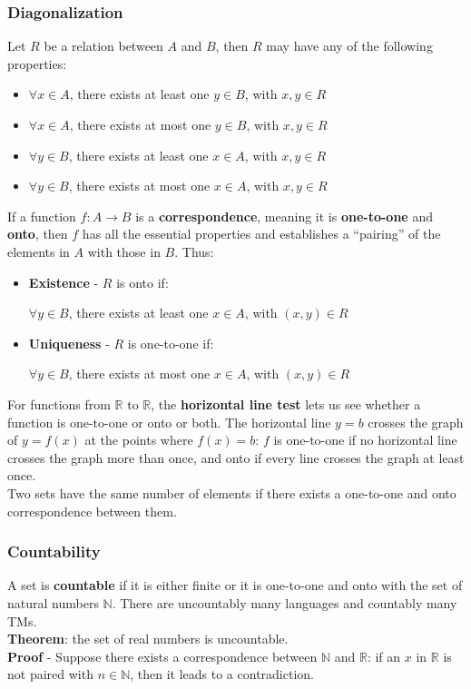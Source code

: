 \documentclass{article}
\begin{document}
\subsubsection{Diagonalization}
Let $R$ be a relation between $A$ and $B$, then $R$ may have any of the following properties:
\begin{itemize}
    \item $\forall x \in A$, there exists at least one $y \in B$, with $x, y \in R$ 
    \item $\forall x \in A$, there exists at most one $y \in B$, with $x, y \in R$ 
    \item $\forall y \in B$, there exists at least one $x \in A$, with $x, y \in R$ 
    \item $\forall y \in B$, there exists at most one $x \in A$, with $x, y \in R$ 
\end{itemize}
If a function $f: A\rightarrow B$ is a \textbf{correspondence}, meaning it is \textbf{one-to-one} and \textbf{onto}, then $f$ has all the essential properties and establishes a “pairing” of the elements in $A$ with those in $B$. Thus:
\begin{itemize}
    \item \textbf{Existence} - $R$ is onto if:
    \begin{center}
        $\forall y \in B$, there exists at least one $x \in A$, with $(x,y) \in R$
    \end{center}
    \item \textbf{Uniqueness} - $R$ is one-to-one if:
    \begin{center}
        $\forall y \in B$, there exists at most one $x \in A$, with $(x,y) \in R$
    \end{center}
\end{itemize}
For functions from $\mathbb{R}$ to $\mathbb{R}$, the \textbf{horizontal line test} lets us see whether a function is one-to-one or onto or both. The horizontal line $y = b$ crosses the graph of $y = f(x)$ at the points where $f(x) = b$: $f$ is one-to-one if no horizontal line crosses the graph more than once, and onto if every line crosses the graph at least once. \\
Two sets have the same number of elements if there exists a one-to-one and onto correspondence between them.
\subsubsection{Countability}
A set is \textbf{countable} if it is either finite or it is one-to-one and onto with the set of natural numbers $\mathbb{N}$. There are uncountably many languages and countably many TMs.
\vspace{0.2cm} \\
\textbf{Theorem}: the set of real numbers is uncountable.
\vspace{0.1cm} \\
\textbf{Proof} - Suppose there exists a correspondence between $\mathbb{N}$ and $\mathbb{R}$: if an $x$ in $\mathbb{R}$ is not paired with $n \in \mathbb{N}$, then it leads to a contradiction.
\end{document}
